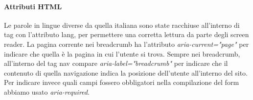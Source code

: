 \paragraph{Attributi HTML} 
Le parole in lingue diverse da quella italiana sono state racchiuse all’interno di tag con l’attributo lang, per permettere una corretta lettura da parte degli screen reader. La pagina corrente nei breadcrumb ha l'attributo \textit{aria-current="page"} per indicare che quella è la pagina in cui l'utente si trova. Sempre nei breadcrumb, all'interno del tag nav compare \textit{aria-label="breadcrumb"} per indicare che il contenuto di quella navigazione indica la posizione dell'utente all'interno del sito.\\
Per indicare invece quali campi fossero obbligatori nella compilazione del form abbiamo usato \textit{aria-required}.
